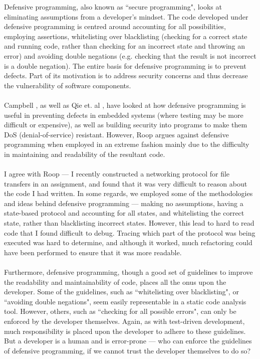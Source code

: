Defensive programming, also known as ``secure programming", looks at eliminating assumptions from
a developer's mindset.
The code developed under defensive programming is centred around accounting for all possibilities,
employing assertions, whitelisting over blacklisting (checking for a correct state and running code,
rather than checking for an incorrect state and throwing an error) and avoiding double negations (e.g. checking that
the result is not incorrect is a double negation).
The entire basis for defensive programming is to prevent defects.
Part of its motivation is to address security concerns and thus decrease the vulnerability of
software components.\\
\\
Campbell \cite{campbell1998defensive}, as well as Qie et. al \cite{qie2002defensive}, have looked at
how defensive programming is useful in preventing defects in embedded systems (where testing may
be more difficult or expensive), as well as building security into programs to make them DoS
(denial-of-service) resistant.
However, Roop \cite{roop2009defensive} argues against defensive programming when employed in an extreme fashion
mainly due to the difficulty in maintaining and readability of the resultant code.\\
\\
I agree with Roop --- I recently constructed a networking protocol for file transfers in an
assignment, and found that it was very difficult to reason about the code I had written.
In some regards, we employed some of the methodologies and ideas behind defensive programming ---
making no assumptions, having a state-based protocol and accounting for all states, and whitelisting
the correct state, rather than blacklisting incorrect states.
However, this lead to hard to read code that I found difficult to debug.
Tracing which part of the protocol was being executed was hard to determine, and although it worked,
much refactoring could have been performed to ensure that it was more readable.\\
\\
Furthermore, defensive programming, though a good set of guidelines to improve the readability and
maintainability of code, places all the onus upon the developer.
Some of the guidelines, such as ``whitelisting over blacklisting", or ``avoiding double negations",
seem easily representable in a static code analysis tool.
However, others, such as ``checking for all possible errors", can only be enforced by the developer
themselves.
Again, as with test-driven development, much responsibility is placed upon the developer to adhere
to these guidelines.
But a developer is a human and is error-prone --- who can enforce the guidelines of defensive
programming, if we cannot trust the developer themselves to do so?

